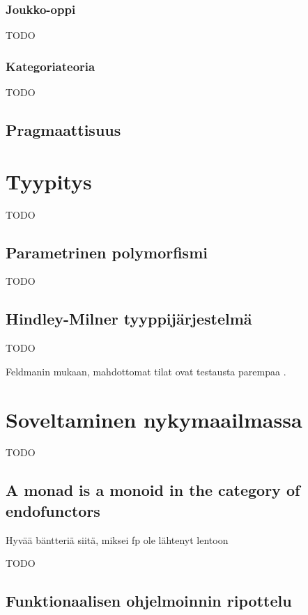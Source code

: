 \subsubsection{Joukko-oppi}

TODO

\subsubsection{Kategoriateoria}

TODO

\subsection{Pragmaattisuus}




\section{Tyypitys}

TODO

\subsection{Parametrinen polymorfismi}

TODO

\subsection{Hindley-Milner tyyppijärjestelmä}

TODO

Feldmanin mukaan, mahdottomat tilat ovat testausta parempaa \cite{impossiblebetter}.


\section{Soveltaminen nykymaailmassa}

TODO


\subsection{A monad is a monoid in the category of endofunctors}

Hyvää bäntteriä siitä, miksei fp ole lähtenyt lentoon

TODO

\subsection{Funktionaalisen ohjelmoinnin ripottelu}

